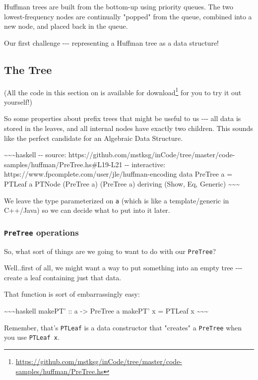 \documentclass[]{article}
\renewcommand{\href}[2]{#2\footnote{\url{#1}}}
\begin{document}
Huffman trees are built from the bottom-up using priority queues. The two
lowest-frequency nodes are continually "popped" from the queue, combined into a
new node, and placed back in the queue.

Our first challenge -\/-\/- representing a Huffman tree as a data structure!

\subsection{The Tree}

(All the code in this section on is
\href{https://github.com/mstksg/inCode/tree/master/code-samples/huffman/PreTree.hs}{available
for download} for you to try it out yourself!)

So some properties about prefix trees that might be useful to us -\/-\/- all
data is stored in the leaves, and all internal nodes have exactly two children.
This sounds like the perfect candidate for an Algebraic Data Structure.

\textasciitilde{}\textasciitilde{}\textasciitilde{}haskell -\/- source:
https://github.com/mstksg/inCode/tree/master/code-samples/huffman/PreTree.hs\#L19-L21
-\/- interactive: https://www.fpcomplete.com/user/jle/huffman-encoding data
PreTree a = PTLeaf a \textbar{} PTNode (PreTree a) (PreTree a) deriving (Show,
Eq, Generic) \textasciitilde{}\textasciitilde{}\textasciitilde{}

We leave the type parameterized on \texttt{a} (which is like a template/generic
in C++/Java) so we can decide what to put into it later.

\subsubsection{\texorpdfstring{\texttt{PreTree} operations}{PreTree operations}}

So, what sort of things are we going to want to do with our \texttt{PreTree}?

Well..first of all, we might want a way to put something into an empty tree
-\/-\/- create a leaf containing just that data.

That function is sort of embarrassingly easy:

\textasciitilde{}\textasciitilde{}\textasciitilde{}haskell makePT' :: a
-\textgreater{} PreTree a makePT' x = PTLeaf x
\textasciitilde{}\textasciitilde{}\textasciitilde{}

Remember, that's \texttt{PTLeaf} is a data constructor that "creates" a
\texttt{PreTree} when you use \texttt{PTLeaf\ x}.
\end{document}
